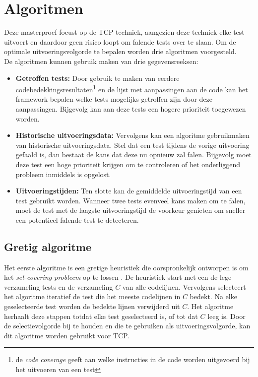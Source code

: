 \section{Algoritmen}
\noindent Deze masterproef focust op de TCP techniek, aangezien deze techniek elke test uitvoert en daardoor geen risico loopt om falende tests over te slaan. Om de optimale uitvoeringsvolgorde te bepalen worden drie algoritmen voorgesteld.\\

\noindent De algoritmen kunnen gebruik maken van drie gegevensreeksen:\\

\begin{itemize}[leftmargin=1em]
\item \textbf{Getroffen tests:} Door gebruik te maken van eerdere codebedekkingsresultaten\footnote{de \emph{code coverage} geeft aan welke instructies in de code worden uitgevoerd bij het uitvoeren van een test} en de lijst met aanpassingen aan de code kan het framework bepalen welke tests mogelijks getroffen zijn door deze aanpassingen. Bijgevolg kan aan deze tests een hogere prioriteit toegewezen worden.

\item \textbf{Historische uitvoeringsdata:} Vervolgens kan een algoritme gebruikmaken van historische uitvoeringsdata. Stel dat een test tijdens de vorige uitvoering gefaald is, dan bestaat de kans dat deze nu opnieuw zal falen. Bijgevolg moet deze test een hoge prioriteit krijgen om te controleren of het onderliggend probleem inmiddels is opgelost.

\item \textbf{Uitvoeringstijden:} Ten slotte kan de gemiddelde uitvoeringstijd van een test gebruikt worden. Wanneer twee tests evenveel kans maken om te falen, moet de test met de laagste uitvoeringstijd de voorkeur genieten om sneller een potentieel falende test te detecteren.
\end{itemize}

\subsection{Gretig algoritme}
\noindent Het eerste algoritme is een gretige heuristiek die oorspronkelijk ontworpen is om het \emph{set-covering probleem} op te lossen \cite{evaluationoftestsuiteminimization}. De heuristiek start met een de lege verzameling tests en de verzameling $C$ van alle codelijnen. Vervolgens selecteert het algoritme iteratief de test die het meeste codelijnen in $C$ bedekt. Na elke geselecteerde test worden de bedekte lijnen verwijderd uit $C$. Het algoritme herhaalt deze stappen totdat elke test geselecteerd is, of tot dat $C$ leeg is. Door de selectievolgorde bij te houden en die te gebruiken als uitvoeringsvolgorde, kan dit algoritme worden gebruikt voor TCP.

